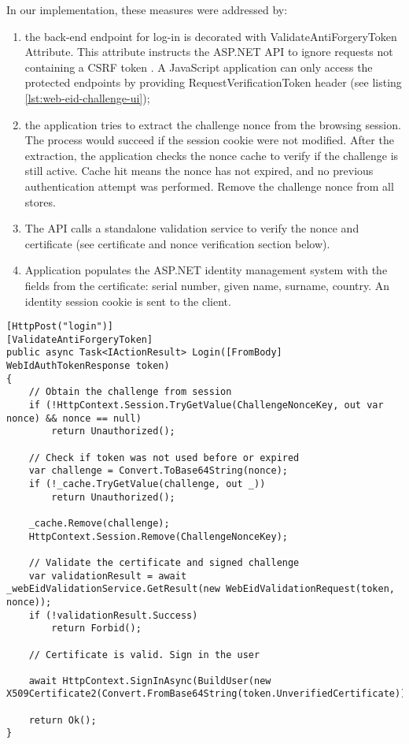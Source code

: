 In our implementation, these measures were addressed by:
\begin{enumerate}
  \item the back-end endpoint for log-in is decorated with ValidateAntiForgeryToken Attribute. This attribute instructs the ASP.NET API to ignore requests not containing a CSRF token \cite{msdocs-anti-request-forgery}. A JavaScript application can only access the protected endpoints by providing RequestVerificationToken header (see listing \ref{lst:web-eid-challenge-ui});
  \item the application tries to extract the challenge nonce from the browsing session. The process would succeed if the session cookie were not modified. After the extraction, the application checks the nonce cache to verify if the challenge is still active. Cache hit means the nonce has not expired, and no previous authentication attempt was performed. Remove the challenge nonce from all stores.
  \item The API calls a standalone validation service to verify the nonce and certificate (see certificate and nonce verification section below).
  \item Application populates the ASP.NET identity management system with the fields from the certificate: serial number, given name, surname, country. An identity session cookie is sent to the client.
\end{enumerate}

\begin{lstlisting}[caption={Web eID Login Endpoint}, label={lst:web-eid-login}]
[HttpPost("login")]
[ValidateAntiForgeryToken]
public async Task<IActionResult> Login([FromBody] WebIdAuthTokenResponse token)
{
    // Obtain the challenge from session
    if (!HttpContext.Session.TryGetValue(ChallengeNonceKey, out var nonce) && nonce == null)
        return Unauthorized();

    // Check if token was not used before or expired
    var challenge = Convert.ToBase64String(nonce);
    if (!_cache.TryGetValue(challenge, out _))
        return Unauthorized();

    _cache.Remove(challenge);
    HttpContext.Session.Remove(ChallengeNonceKey);

    // Validate the certificate and signed challenge
    var validationResult = await _webEidValidationService.GetResult(new WebEidValidationRequest(token, nonce));
    if (!validationResult.Success)
        return Forbid();

    // Certificate is valid. Sign in the user

    await HttpContext.SignInAsync(BuildUser(new X509Certificate2(Convert.FromBase64String(token.UnverifiedCertificate)).Subject));

    return Ok();
}
\end{lstlisting}

